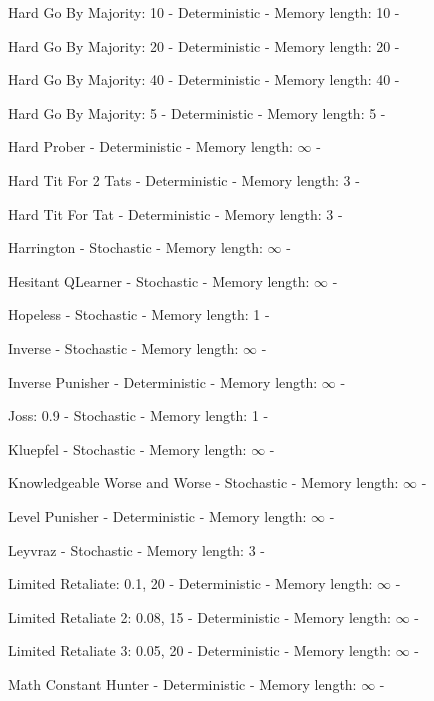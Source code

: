 \item Hard Go By Majority: 10 - Deterministic - Memory length: 10 - \cite{Knight2018}
\item Hard Go By Majority: 20 - Deterministic - Memory length: 20 - \cite{Knight2018}
\item Hard Go By Majority: 40 - Deterministic - Memory length: 40 - \cite{Knight2018}
\item Hard Go By Majority: 5 - Deterministic - Memory length: 5 - \cite{Knight2018}
\item Hard Prober - Deterministic - Memory length: \(\infty\) - \cite{Prison1998}
\item Hard Tit For 2 Tats - Deterministic - Memory length: 3 - \cite{Stewart2012}
\item Hard Tit For Tat - Deterministic - Memory length: 3 - \cite{PD2017}
\item Harrington - Stochastic - Memory length: \(\infty\) - \cite{Axelrod1980b}
\item Hesitant QLearner - Stochastic - Memory length: \(\infty\) - \cite{Knight2018}
\item Hopeless - Stochastic - Memory length: 1 - \cite{Berg2015}
\item Inverse - Stochastic - Memory length: \(\infty\) - \cite{Knight2018}
\item Inverse Punisher - Deterministic - Memory length: \(\infty\) - \cite{Knight2018}
\item Joss: 0.9 - Stochastic - Memory length: 1 - \cite{Axelrod1980, Stewart2012}
\item Kluepfel - Stochastic - Memory length: \(\infty\) - \cite{Axelrod1980b}
\item Knowledgeable Worse and Worse - Stochastic - Memory length: \(\infty\) - \cite{Knight2018}
\item Level Punisher - Deterministic - Memory length: \(\infty\) - \cite{Eckhart2015}
\item Leyvraz - Stochastic - Memory length: 3 - \cite{Axelrod1980b}
\item Limited Retaliate: 0.1, 20 - Deterministic - Memory length: \(\infty\) - \cite{Knight2018}
\item Limited Retaliate 2: 0.08, 15 - Deterministic - Memory length: \(\infty\) - \cite{Knight2018}
\item Limited Retaliate 3: 0.05, 20 - Deterministic - Memory length: \(\infty\) - \cite{Knight2018}
\item Math Constant Hunter - Deterministic - Memory length: \(\infty\) - \cite{Knight2018}
